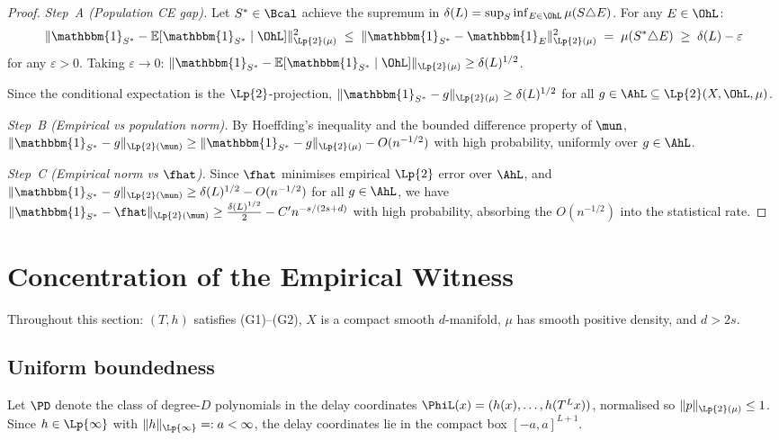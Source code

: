 \begin{proof}
\emph{Step~A (Population CE gap).}
Let $S^* \in \Bcal$ achieve the supremum in $\delta(L) = \sup_S \inf_{E \in \OhL} \mu(S \triangle E)$.
For any $E \in \OhL$:
\[
  \|\mathbbm{1}_{S^*} - \mathbb{E}[\mathbbm{1}_{S^*} \mid \OhL]\|_{\Lp{2}(\mu)}^2
  \;\leq\;
  \|\mathbbm{1}_{S^*} - \mathbbm{1}_E\|_{\Lp{2}(\mu)}^2
  \;=\; \mu(S^* \triangle E) \;\geq\; \delta(L) - \varepsilon
\]
for any $\varepsilon > 0$.
Taking $\varepsilon \to 0$: $\|\mathbbm{1}_{S^*} - \mathbb{E}[\mathbbm{1}_{S^*} \mid \OhL]\|_{\Lp{2}(\mu)}
\geq \delta(L)^{1/2}$.

Since the conditional expectation is the $\Lp{2}$-projection,
$\|\mathbbm{1}_{S^*} - g\|_{\Lp{2}(\mu)} \geq \delta(L)^{1/2}$ for all $g \in \AhL \subseteq \Lp{2}(X, \OhL, \mu)$.

\emph{Step~B (Empirical vs population norm).}
By Hoeffding's inequality and the bounded difference property of $\mun$,
$\|\mathbbm{1}_{S^*} - g\|_{\Lp{2}(\mun)} \geq \|\mathbbm{1}_{S^*} - g\|_{\Lp{2}(\mu)} - O(n^{-1/2})$
with high probability, uniformly over $g \in \AhL$.

\emph{Step~C (Empirical norm vs $\fhat$).}
Since $\fhat$ minimises empirical $\Lp{2}$ error over $\AhL$, and
$\|\mathbbm{1}_{S^*} - g\|_{\Lp{2}(\mun)} \geq \delta(L)^{1/2} - O(n^{-1/2})$
for all $g \in \AhL$, we have
$\|\mathbbm{1}_{S^*} - \fhat\|_{\Lp{2}(\mun)} \geq \frac{\delta(L)^{1/2}}{2} - C' n^{-s/(2s+d)}$
with high probability, absorbing the $O(n^{-1/2})$ into the statistical rate.
\end{proof}

\section{Concentration of the Empirical Witness}
\label{III:sec:concentration}

Throughout this section: $(T,h)$ satisfies (G1)--(G2), $X$ is a compact
smooth $d$-manifold, $\mu$ has smooth positive density, and $d > 2s$.

\subsection{Uniform boundedness}
\label{III:subsec:bounded}

Let $\PD$ denote the class of degree-$D$ polynomials in the delay coordinates
$\PhiL(x) = (h(x),\ldots,h(T^L x))$, normalised so $\|p\|_{\Lp{2}(\mu)} \leq 1$.
Since $h \in \Lp{\infty}$ with $\|h\|_{\Lp{\infty}} =: a < \infty$, the delay
coordinates lie in the compact box $[-a,a]^{L+1}$.

